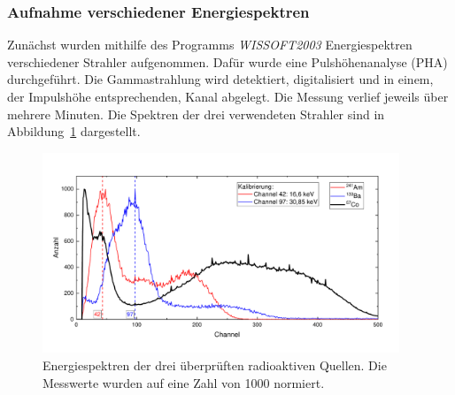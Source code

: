 \documentclass[a4paper,twoside,final]{article}
\begin{document}
\subsubsection{Aufnahme verschiedener Energiespektren}
Zunächst wurden mithilfe des Programms \textit{WISSOFT2003} Energiespektren verschiedener Strahler aufgenommen. Dafür wurde eine Pulshöhenanalyse (PHA) durchgeführt. Die Gammastrahlung wird detektiert, digitalisiert und in einem, der Impulshöhe entsprechenden, Kanal abgelegt. Die Messung verlief jeweils über mehrere Minuten. Die Spektren der drei verwendeten Strahler sind in Abbildung~\ref{fig:Energiespektren} dargestellt.
\begin{figure}[htp]
    \vspace{-0.5cm}
    \centering
    \includegraphics[width=0.95\textwidth]{Bilder/Energiespektren_Am_Ba_Co.pdf}
    \caption{Energiespektren der drei überprüften radioaktiven Quellen. Die Messwerte wurden auf eine Zahl von 1000 \glqq normiert\grqq.}
    \label{fig:Energiespektren}
\end{figure}
\end{document}
